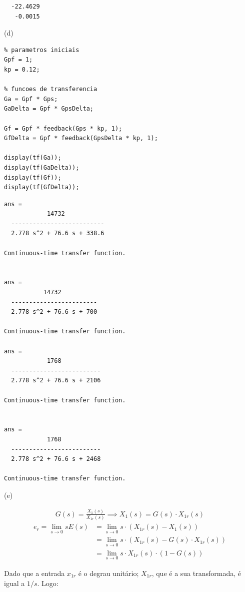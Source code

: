 \documentclass[a4paper,11pt]{article}
\begin{document}
\begin{lstlisting}
  -22.4629
   -0.0015
\end{lstlisting}

(d)

\begin{lstlisting}
% parametros iniciais
Gpf = 1;
kp = 0.12;

% funcoes de transferencia
Ga = Gpf * Gps;
GaDelta = Gpf * GpsDelta;

Gf = Gpf * feedback(Gps * kp, 1);
GfDelta = Gpf * feedback(GpsDelta * kp, 1);

display(tf(Ga));
display(tf(GaDelta));
display(tf(Gf));
display(tf(GfDelta));
\end{lstlisting}

\begin{lstlisting}
ans =
            14732
  --------------------------
  2.778 s^2 + 76.6 s + 338.6
 
Continuous-time transfer function.


ans =
           14732
  ------------------------
  2.778 s^2 + 76.6 s + 700
 
Continuous-time transfer function.

ans =
            1768
  -------------------------
  2.778 s^2 + 76.6 s + 2106
 
Continuous-time transfer function.


ans =
            1768
  -------------------------
  2.778 s^2 + 76.6 s + 2468
 
Continuous-time transfer function.
\end{lstlisting}

(e)

\begin{gather*}
    G\left(s\right) = \frac{X_1\left(s\right)}{X_{1r}\left(s\right)} \implies
         X_1\left(s\right) = G\left(s\right) \cdot X_{1r}\left(s\right)
\end{gather*}
\begin{align*}
\label{eq:1}
    e_r = \lim_{s\to0} sE\left(s\right) &= \lim_{s\to0} s \cdot \left(X_{1r}
        \left(s\right) - X_1\left(s\right)\right) \\
    &= \lim_{s\to0} s \cdot \left(X_{1r}\left(s\right) - G\left(s\right) \cdot
        X_{1r}\left(s\right)\right) \\
    &= \lim_{s\to0} s \cdot X_{1r}\left(s\right) \cdot
        \left(1 - G\left(s\right)\right)
\end{align*}

Dado que a entrada $x_{1r}$ é o degrau unitário; $X_{1r}$, que é a sua
transformada, é igual a $1/s$. Logo:
\end{document}
